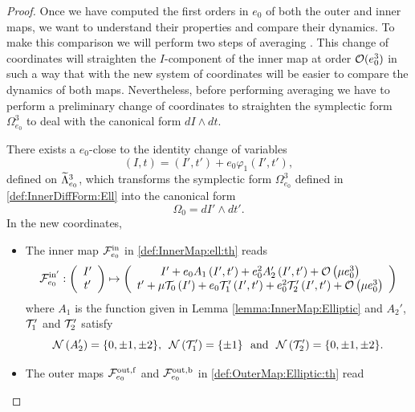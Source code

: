 \begin{proof} Once we have computed the first orders in $e_0$ of both the outer and inner maps,
  we want to understand their properties and compare their dynamics. To make this comparison
  we will perform two steps of averaging \cite{ArnoldKN88,LochakM88}. This change of coordinates will
  straighten the $I$-component of the inner map at order $\mathcal{O}(e_0^3)$ in such a way that with
  the new system of coordinates will be easier to compare the dynamics of both maps. Nevertheless, before performing averaging we have to perform a preliminary change of coordinates to straighten the symplectic form $\Omega_{e_0}^3$ to deal with the canonical form $dI\wedge dt$.

\begin{lemma}\label{lemma:StraighteningOmega}
There exists a $e_0$-close to the identity change of variables
\begin{equation}\label{def:SymplecticFormChange}
(I,t)=\left(I',t'\right)+e_0\varphi_1 \left(I',t'\right),
\end{equation}
defined on $\widetilde \Lambda^3_{e_0}$, which transforms the symplectic form $\Omega^3_{e_0}$ defined in \eqref{def:InnerDiffForm:Ell} into the canonical form
\[
 \Omega_0=dI'\wedge dt'.
\]
In the new coordinates,
\begin{itemize}
\item The inner map $\mathcal{F}_{e_0}^{\mathrm{in}}$
in \eqref{def:InnerMap:ell:th} reads
\begin{equation}\label{def:InnerMap:ell:straightening}
  \mathcal{F}_{e_0}^{\mathrm{in}'}:\left(\begin{array}{c} I'\\
          t'
        \end{array}\right)\mapsto \left(\begin{array}{c}  I'+e_0 A_1\left(I',t'\right)+e_0^2 A_2'\left(I',t'\right)+\mathcal{O}\left(\mu e_0^3\right)\\
          t'+\mu\mathcal{T}_0\left(I'\right)+e_0 \mathcal{T}_1'\left(I',t'\right)+e_0^2 \mathcal{T}_2'\left(I',t'\right)+\mathcal{O}\left(\mu e_0^3\right)
        \end{array}\right)
    \end{equation}
where $A_1$ is the function given in Lemma \ref{lemma:InnerMap:Elliptic} and $A_2'$, $\mathcal{T}_1'$ and $\mathcal{T}_2'$ satisfy
\[
 \mathcal{N}\left(A_2'\right)=\{0,\pm 1,\pm 2\},\,\,\,\mathcal{N}\left(\mathcal{T}_1'\right)=\{\pm 1\}\,\,\text{ and }\,\,\mathcal{N}\left(\mathcal{T}_2'\right)=\{0,\pm 1,\pm 2\}.
\]
\item The outer maps $\mathcal{F}_{e_0}^{\mathrm{out},\mathrm{f}}$ and $\mathcal{F}_{e_0}^{\mathrm{out},\mathrm{b}}$ in \eqref{def:OuterMap:Elliptic:th} read

\end{itemize}
\end{lemma}
\end{proof}
